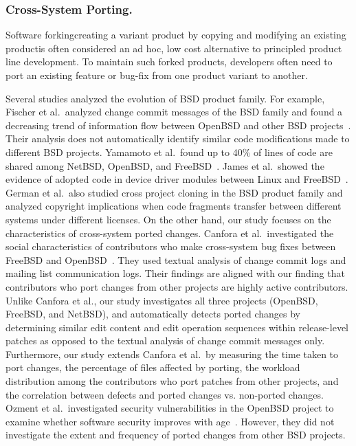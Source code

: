 \documentclass[runningheads,a4paper]{llncs}
\begin{document}
\subsubsection{Cross-System Porting.} 
Software forking\textemdash creating a variant product by copying and modifying an existing product\textemdash is often considered an ad hoc, low cost alternative to principled product line development. To maintain such forked products, developers often need to port an existing feature or bug-fix from one product variant to another. 

Several studies analyzed the evolution of BSD product family. For example, Fischer et al.~analyzed change commit messages of the BSD family and found a decreasing trend of information flow between OpenBSD and other BSD projects~\cite{Fischer2005}. Their analysis does not automatically identify similar code modifications made to different BSD projects. Yamamoto et al.~found up to 40\% of lines of code are shared among NetBSD, OpenBSD, and FreeBSD~\cite{Yamamoto2005}. James et al.~showed the evidence of adopted code in device driver modules between Linux and FreeBSD~\cite{Cordy2011:largecloning}. 
German et al.~also studied cross project cloning in the BSD product family and analyzed copyright implications when code fragments transfer between different systems under different licenses. On the other hand, our study focuses on the characteristics of cross-system ported changes. 
Canfora et al.~investigated the social characteristics of contributors who make cross-system bug fixes between FreeBSD and OpenBSD~\cite{Canfora2011:bsdfork}. They used textual analysis of change commit logs and mailing list communication logs. Their findings are aligned with our finding that contributors who port changes from other projects are highly active contributors.  Unlike Canfora et al., our study investigates all three projects (OpenBSD,  FreeBSD, and NetBSD), and automatically detects ported changes by determining similar edit content and edit operation sequences within release-level patches as opposed to the textual analysis of change commit messages only. Furthermore, our study extends Canfora et al.~by measuring the time taken to port changes, the percentage of files affected by porting, the workload distribution among the contributors who port patches from other projects, and the correlation between defects and ported changes vs. non-ported changes. Ozment et al.~investigated security vulnerabilities in the OpenBSD project to examine whether software security improves with age~\cite{Ozment2006}. However, they did not investigate the extent and frequency of ported changes from other BSD projects. 
\end{document}
